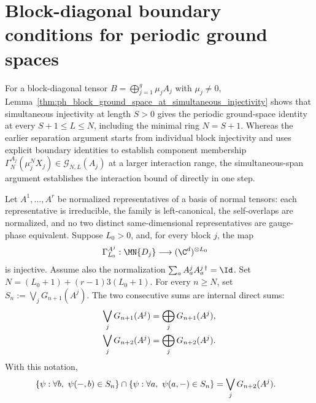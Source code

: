 \section{Block-diagonal boundary conditions for periodic ground spaces}
\label{sec:block_diagonal_boundary_closing}

For a block-diagonal tensor $B=\bigoplus_{j=1}^g\mu_jA_j$ with $\mu_j\ne0$,
Lemma~\ref{thm:ph_block_ground_space_at_simultaneous_injectivity} shows that
simultaneous injectivity at length $S>0$ gives the periodic ground-space
identity at every $S+1\leq L\leq N$, including the minimal ring $N=S+1$.
Whereas the earlier separation argument starts from individual block
injectivity and uses explicit boundary identities to establish component
membership $\Gamma_N^{A_j}(\mu_j^NX_j)\in\mathcal G_{N,L}(A_j)$ at a larger
interaction range, the simultaneous-span argument establishes the interaction
bound of \cite[Theorem~IV.16]{Cirac2021Matrix} directly in one step.

\begin{lemma}
    \label{lem:bnt_direct_sum_unital_block_intersection_ge}
    \leanok
    Let $A^1,\ldots,A^r$ be normalized representatives of a basis of normal
    tensors: each representative is irreducible, the family is left-canonical,
    the self-overlaps are normalized, and no two distinct same-dimensional
    representatives are gauge-phase equivalent. Suppose $L_0>0$, and, for
    every block $j$, the map
    \begin{align}
        \Gamma_{L_0}^{A^j}:\MN{D_j}
         & \longrightarrow(\C^d)^{\otimes L_0}
        \notag
    \end{align}
    is injective. Assume also the normalization
    $\sum_a A^j_aA^{j\,\dagger}_a=\Id$. Set
    $N=(L_0+1)+(r-1)3(L_0+1)$. For every $n\ge N$, set
    $S_n:=\bigvee_jG_{n+1}(A^j)$. The two consecutive sums are internal direct
    sums:
    \begin{align}
        \bigvee_jG_{n+1}(A^j)
         & =\bigoplus_jG_{n+1}(A^j),
        \notag                       \\
        \bigvee_jG_{n+2}(A^j)
         & =\bigoplus_jG_{n+2}(A^j).
        \notag
    \end{align}
    With this notation,
    \begin{align}
         & \left\{\psi:\forall b,\ \psi(-,b)\in S_n\right\}
        \cap
        \left\{\psi:\forall a,\ \psi(a,-)\in S_n\right\} =\bigvee_jG_{n+2}(A^j).
        \notag
    \end{align}
\end{lemma}

